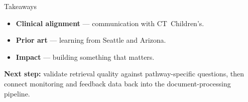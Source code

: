 \documentclass[final]{beamer}
\newlength{\sepwid}
\newlength{\onecolwid}
\begin{document}
\begin{frame}[t]
\begin{columns}[t]
\begin{column}{\onecolwid}
\begin{block}{Takeaways}
\normalsize
\justifying
\begin{itemize}
\item \textbf{Clinical alignment} --- communication with CT~Children's.
\item \textbf{Prior art} --- learning from Seattle and Arizona.
\item \textbf{Impact} --- building something that matters.
\end{itemize}

\vspace{0.3em}
\textbf{Next step:} validate retrieval quality against pathway-specific questions, then connect monitoring and feedback data back into the document-processing pipeline.
\end{block}

\end{column}
\begin{column}{\sepwid}\end{column}

\end{columns}
\end{frame}
\end{document}
